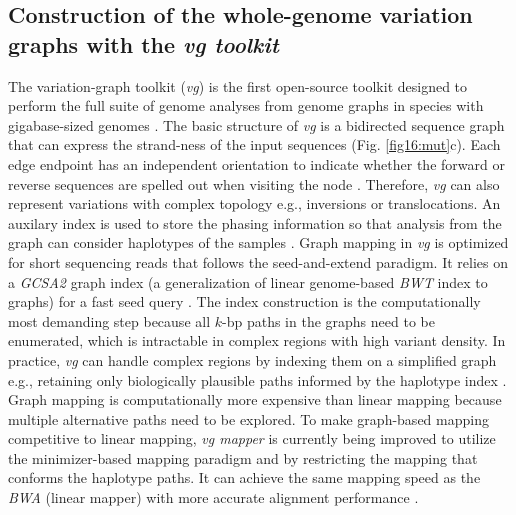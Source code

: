 \documentclass[../main.tex]{subfiles}
\begin{document}
\subsection*{Construction of the whole-genome variation graphs with the \emph{vg toolkit}}

The variation-graph toolkit (\emph{vg}) is the first open-source toolkit designed to perform the full suite of genome analyses from genome graphs in species with gigabase-sized genomes \citep{garrison2018variation}. The basic structure of \emph{vg} is a bidirected sequence graph that can express the strand-ness of the input sequences (Fig. \ref{fig16:mut}c). Each edge endpoint has an independent orientation to indicate whether the forward or reverse sequences are spelled out when visiting the node \citep{paten2017genome}. Therefore, \emph{vg} can also represent variations with complex topology e.g., inversions or translocations. An auxilary index is used to store the phasing information so that analysis from the graph can consider haplotypes of the samples \citep{siren2020haplotype}. Graph mapping in \emph{vg} is optimized for short sequencing reads that follows the seed-and-extend paradigm. It relies on a \emph{GCSA2 }graph index (a generalization of linear genome-based\emph{ BWT} index to graphs) for a fast seed query \citep{siren2017indexing}. The index construction is the computationally most demanding step because all $k$-bp paths in the graphs need to be enumerated, which is intractable in complex regions with high variant density. In practice, \emph{vg} can handle complex regions by indexing them on a simplified graph e.g., retaining only biologically plausible paths informed by the haplotype index \citep{siren2017indexing}. Graph mapping is computationally more expensive than linear mapping because multiple alternative paths need to be explored. To make graph-based mapping competitive to linear mapping, \emph{vg mapper} is currently being improved to utilize the minimizer-based mapping paradigm and by restricting the mapping that conforms the haplotype paths. It can achieve the same mapping speed as the \emph{BWA} (linear mapper) with more accurate alignment performance \citep{siren2020genotyping}. 
\end{document}
